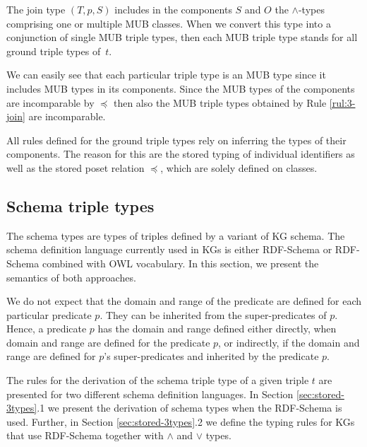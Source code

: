 \documentclass[runningheads]{llncs}
\begin{document}
The join type $(T,p,S)$ includes in the components $S$ and $O$ the
$\land$-types comprising one or multiple MUB classes. When we convert
this type into a conjunction of single MUB triple types, then each MUB
triple type stands for all ground triple types of~$t$.

We can easily see that each particular triple type is an MUB type
since it includes MUB types in its components. Since the MUB types of
the components are incomparable by $\preceq$ then also the MUB triple
types obtained by Rule \ref{rul:3-join} are incomparable.

All rules defined for the ground triple types rely on inferring the
types of their components. The reason for this are the stored typing
of individual identifiers as well as the stored poset relation
$\preceq$, which are solely defined on classes.






\subsection{Schema triple types\label{sec:stored-3types}}

The schema types are types of triples defined by a variant of KG
schema. The schema definition language currently used in KGs is either
RDF-Schema \cite{rdfschema} or RDF-Schema combined with OWL
\cite{owl2} vocabulary. In this section, we present the semantics of
both approaches.

We do not expect that the domain and range of the predicate are defined
for each particular predicate $p$. They can be inherited from the
super-predicates of $p$. Hence, a predicate $p$ has the domain and
range defined either directly, when domain and range are defined for
the predicate $p$, or indirectly, if the domain and range are defined
for $p$'s super-predicates and inherited by the predicate $p$.

The rules for the derivation of the schema triple type of a given
triple $t$ are presented for two different schema definition
languages. In Section \ref{sec:stored-3types}.1 we present the
derivation of schema types when the RDF-Schema is used. Further, in
Section \ref{sec:stored-3types}.2 we define the typing rules for
KGs that use RDF-Schema together with $\land$ and $\lor$ types.
\end{document}
